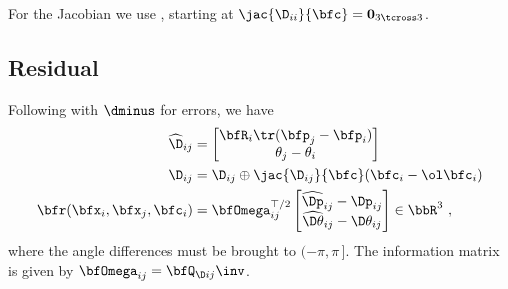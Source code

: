 For the Jacobian we use  , starting at $\jac{\D_{ii}}{\bfc} = {\bf0}_{3\tcross 3}$.


\subsection{Residual}

Following  with $\dminus$ for errors, we have
%
\begin{align}\label{equ:diff_drive_residual}
\widehat\D_{ij} &= \begin{bmatrix}
\bfR_{i}\tr(\bfp_j-\bfp_i) \\ \theta_j-\theta_i 
\end{bmatrix} \\
\D_{ij} &= \D_{ij} \oplus \jac{\D_{ij}}{\bfc}(\bfc_i-\ol\bfc_i) \\
\bfr(\bfx_i,\bfx_j,\bfc_{i})
&= \bfOmega_{ij}^{\top/2} \begin{bmatrix}
\widehat{\Dp}_{ij}-\Dp_{ij} \\
\widehat{\D\theta}_{ij} - \D\theta_{ij}
\end{bmatrix}
\in \bbR^3
~,
\end{align}
%
where the angle differences must be brought to $(-\pi,\pi\,]$.
The information matrix is given by $\bfOmega_{ij}=\bfQ_{\D ij}\inv$.




